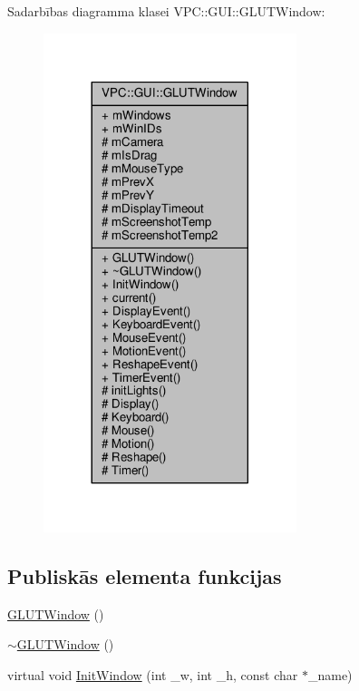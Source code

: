 Sadarbības diagramma klasei V\+PC\+:\+:G\+UI\+:\+:G\+L\+U\+T\+Window\+:
\nopagebreak
\begin{figure}[H]
\begin{center}
\leavevmode
\includegraphics[width=209pt]{class_v_p_c_1_1_g_u_i_1_1_g_l_u_t_window__coll__graph}
\end{center}
\end{figure}
\subsection*{Publiskās elementa funkcijas}
\begin{DoxyCompactItemize}
\item 
\hyperlink{class_v_p_c_1_1_g_u_i_1_1_g_l_u_t_window_a34872e6244c4762090285b502c594336}{G\+L\+U\+T\+Window} ()
\item 
\hyperlink{class_v_p_c_1_1_g_u_i_1_1_g_l_u_t_window_a432925ff6224cffc0b63b496a493ab61}{$\sim$\+G\+L\+U\+T\+Window} ()
\item 
virtual void \hyperlink{class_v_p_c_1_1_g_u_i_1_1_g_l_u_t_window_a2e763564b7728a1b8faf65694f148d79}{Init\+Window} (int \+\_\+w, int \+\_\+h, const char $\ast$\+\_\+name)
\end{DoxyCompactItemize}
